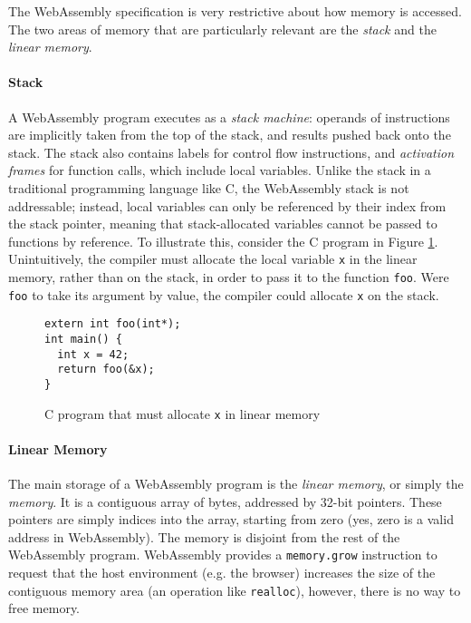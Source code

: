 \label{sec:wasm-memory-model}

The WebAssembly specification \cite{rossbergWebAssemblyCoreSpecification2022} is very restrictive about how memory is accessed. The two areas of memory that are particularly relevant are the \emph{stack} and the \emph{linear memory}.

\paragraph{Stack}

A WebAssembly program executes as a \emph{stack machine}: operands of instructions are implicitly taken from the top of the stack, and results pushed back onto the stack. The stack also contains labels for control flow instructions, and \emph{activation frames} for function calls, which include local variables. Unlike the stack in a traditional programming language like C, the WebAssembly stack is not addressable; instead, local variables can only be referenced by their index from the stack pointer, meaning that stack-allocated variables cannot be passed to functions by reference. To illustrate this, consider the C program in Figure \ref{fig:stack-c}. Unintuitively, the compiler must allocate the local variable \texttt{x} in the linear memory, rather than on the stack, in order to pass it to the function \texttt{foo}. Were \texttt{foo} to take its argument by value, the compiler could allocate \texttt{x} on the stack.

\begin{figure}[H]
\centering
\begin{verbatim}
extern int foo(int*);
int main() {
  int x = 42;
  return foo(&x);
}
\end{verbatim}
\caption{C program that must allocate \texttt{x} in linear memory}
\label{fig:stack-c}
\end{figure}

\paragraph{Linear Memory}

The main storage of a WebAssembly program is the \emph{linear memory}, or simply the \emph{memory}. It is a contiguous array of bytes, addressed by 32-bit pointers. These pointers are simply indices into the array, starting from zero (yes, zero is a valid address in WebAssembly). The memory is disjoint from the rest of the WebAssembly program. WebAssembly provides a \texttt{memory.grow} instruction to request that the host environment (e.g. the browser) increases the size of the contiguous memory area (an operation like \texttt{realloc}), however, there is no way to free memory.

